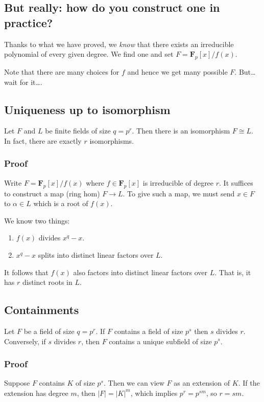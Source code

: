 \documentclass[11pt]{article}
\begin{document}
\subsection{But really: how do you construct one in practice?}
\label{sec:org765fce1}
Thanks to what we have proved, we \emph{know} that there exists an irreducible polynomial of every given degree.
We find one and set \(F = \mathbf{F}_p[x]/f(x)\).

Note that there are many choices for \(f\) and hence we get many possible \(F\).
But\ldots{} wait for it\ldots{}.
\subsection{Uniqueness up to isomorphism}
\label{sec:org96c99f8}
Let \(F\) and \(L\) be finite fields of size \(q = p^r\).
Then there is an isomorphism \(F \cong L\).
In fact, there are exactly \(r\) isomorphisms.
\subsubsection{Proof}
\label{sec:org92f0e80}
Write \(F = \mathbf{F}_p[x]/f(x)\) where \(f \in \mathbf{F}_p[x]\) is irreducible of degree \(r\).
It suffices to construct a map (ring hom) \(F \to L\).
To give such a map, we must send \(x \in F\) to \(\alpha \in L\) which is a root of \(f(x)\).

We know two things:
\begin{enumerate}
\item \(f(x)\) divides \(x^q-x\).
\item \(x^q-x\) splits into distinct linear factors over \(L\).
\end{enumerate}
It follows that \(f(x)\) also factors into distinct linear factors over \(L\).
That is, it has \(r\) distinct roots in \(L\).
\subsection{Containments}
\label{sec:orge51bd25}
Let \(F\) be a field of size \(q = p^{r}\).
If \(F\) contains a field of size \(p^{s}\) then \(s\) divides \(r\).
Conversely, if \(s\) divides \(r\), then \(F\) contains a unique subfield of size \(p^{s}\).
\subsubsection{Proof}
\label{sec:org97f2f42}
Suppose \(F\) contains \(K\) of size \(p^{s}\).
Then we can view \(F\) as an extension of \(K\).
If the extension has degree \(m\), then \(|F| = |K|^m\), which implies \(p^r = p^{sm}\), so \(r = sm\).
\end{document}
